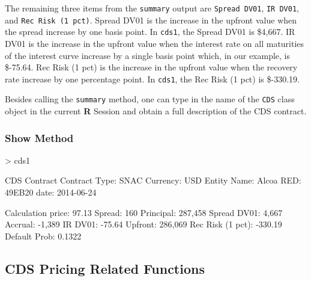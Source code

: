 \documentclass{jss}
\renewenvironment{Schunk}{\vspace{\topsep}}{\vspace{\topsep}}
\begin{document}
The remaining three items from the \texttt{summary} output  are \texttt{Spread DV01}, \texttt{IR DV01}, and \texttt{Rec Risk (1 pct)}. Spread DV01 is the increase in the upfront value when the spread increase by one basis point. In \texttt{cds1}, the Spread DV01 is \$4,667. IR DV01 is the increase in the upfront value when the interest rate on all maturities of the interest curve increase by a single basis point which, in our example, is \$-75.64. Rec Risk (1 pct) is the increase in the upfront value when the recovery rate increase by one percentage point. In \texttt{cds1}, the Rec Risk (1 pct) is \$-330.19.

Besides calling the \texttt{summary} method, one can type in the name of the \texttt{CDS} class object in the current \textbf{R} Session and obtain a full description of the CDS contract.

\subsubsection{Show Method}


\begin{Schunk}
\begin{Sinput}
> cds1
\end{Sinput}
\begin{Soutput}
CDS Contract 
Contract Type:                      SNAC   Currency:                         USD
Entity Name:                       Alcoa   RED:                           49EB20
date:                         2014-06-24

Calculation 
price:                             97.13   Spread:                           160
Principal:                       287,458   Spread DV01:                    4,667
Accrual:                          -1,389   IR DV01:                       -75.64
Upfront:                         286,069   Rec Risk (1 pct):             -330.19
Default Prob:                     0.1322
\end{Soutput}
\end{Schunk}

\subsection{CDS Pricing Related Functions}

\end{document}
